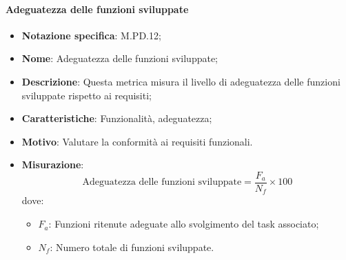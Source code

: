 \paragraph*{Adeguatezza delle funzioni sviluppate}
\begin{itemize}
    \item \textbf{Notazione specifica}: M.PD.12;
    \item \textbf{Nome}: Adeguatezza delle funzioni sviluppate;
    \item \textbf{Descrizione}: Questa metrica misura il livello di adeguatezza delle funzioni sviluppate rispetto ai requisiti;
    \item \textbf{Caratteristiche}: Funzionalità, adeguatezza;
    \item \textbf{Motivo}: Valutare la conformità ai requisiti funzionali.
    \item \textbf{Misurazione}: 
    \[
    \text{Adeguatezza delle funzioni sviluppate} = \frac{F_{a}}{N_{f}} \times 100
    \]
    dove:
    \begin{itemize}
        \item $F_{a}$: Funzioni ritenute adeguate allo svolgimento del task associato;
        \item $N_{f}$: Numero totale di funzioni sviluppate.
    \end{itemize}
\end{itemize}
